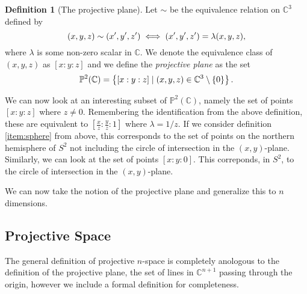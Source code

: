 \documentclass[a4paper]{article}
\theoremstyle{definition}
\newtheorem{defn}{Definition}
\newcommand{\C}{\ensuremath{\mathbb{C}}}
\newcommand{\proj}{\ensuremath{\mathbb{P}}}
\begin{document}
    \begin{defn}[The projective plane]
        Let $\sim$ be the equivalence relation on $\C^3$ defined by
        \begin{equation}
            \notag
            (x, y, z) \sim (x', y', z') \iff (x', y', z') = \lambda(x, y, z),
        \end{equation}
        where $\lambda$ is some non-zero scalar in $\C$. We denote the
        equivalence class of $(x, y, z)$ as $\left[ x : y : z \right]$ and we
        define the \emph{projective plane} as the set
        \begin{equation}
            \notag
            \proj^2(\C) = \left\{ \left[ x : y : z \right] \mid (x, y, z) \in
            \C^3 \setminus \left\{ 0 \right\}\right\}.
        \end{equation}
    \end{defn}

    We can now look at an interesting subset of $\proj^2(\C)$, namely the set
    of points $\left[x : y : z \right]$ where $z \neq 0$. Remembering the
    identification from the above definition, these are equivalent to $\left[
    \frac{x}{z} : \frac{y}{z} : 1 \right]$ where $\lambda = 1 / z$. If we
    consider definition \cref{item:sphere} from above, this corresponds to the
    set of points on the northern hemisphere of $S^2$ not including the circle
    of intersection in the $(x, y)$-plane. Similarly, we can look at the set of
    points $\left[ x : y : 0 \right]$. This correponds, in $S^2$, to the circle
    of intersection in the $(x, y)$-plane.

    We can now take the notion of the
    projective plane and generalize this to $n$ dimensions.
    
    \subsection{Projective Space}
    \label{sub:projective_space}
    
    The general definition of projective $n$-space is completely anologous to
    the definition of the projective plane, the set of lines in $\C^{n+1}$
    passing through the origin, however we include a formal definition for
    completeness.
\end{document}
